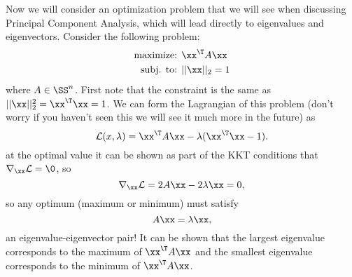 \documentclass{article}
\begin{document}
Now we will consider an optimization problem that we will see when
discussing Principal Component Analysis, which will lead directly
to eigenvalues and eigenvectors. Consider the following problem:
\begin{align*}
    \text{maximize: } & \xx^\T A\xx\\
    \text{subj. to: } & ||\xx||_2 = 1\\
\end{align*}
where $A\in\SS^n$.
First note that the constraint is the same as $||\xx||_2^2 = \xx^\T\xx = 1$.
We can form the Lagrangian of this problem (don't worry if you haven't seen this we
will see it much more in the future) as
\[
    \mathcal{L}(x,\lambda) = \xx^\T A\xx - \lambda (\xx^\T\xx - 1).
\]
at the optimal value it can be shown as part of the KKT conditions that
$\nabla_\xx \mathcal{L} = \0$, so
\[
    \nabla_\xx \mathcal{L} = 2A\xx - 2\lambda\xx = 0,
\]
so any optimum (maximum or minimum) must satisfy
\[
    A\xx = \lambda\xx,
\]
an eigenvalue-eigenvector pair! It can be shown that the largest eigenvalue
corresponds to the maximum of $\xx^\T A\xx$ and the smallest eigenvalue corresponds
to the minimum of $\xx^\T A\xx$.
\end{document}
